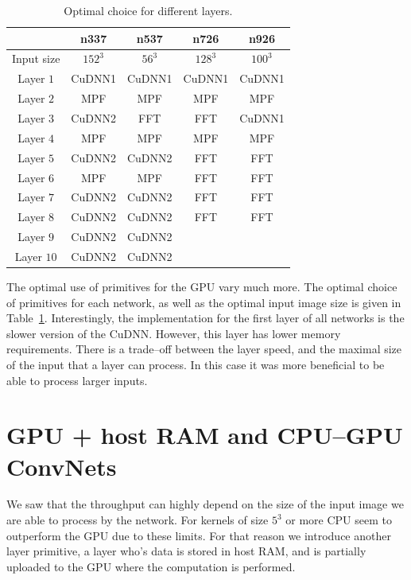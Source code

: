 \documentclass[conference]{./IEEEtran/IEEEtran}
\begin{document}
  \begin{table}
    \centering
    \begin{tabular}{ccccc}
      \toprule
      & n337    & n537  &  n726  &  n926 \\
      \midrule
      Input size & $152^3$ &  $56^3$  & $128^3$  & $100^3$ \\
      \midrule
      Layer $1$  &  CuDNN1  &  CuDNN1  & CuDNN1   & CuDNN1  \\
      Layer $2$  &  MPF     &  MPF     & MPF      & MPF     \\
      Layer $3$  &  CuDNN2  &  FFT     & FFT      & CuDNN1  \\
      Layer $4$  &  MPF     &  MPF     & MPF      & MPF     \\
      Layer $5$  &  CuDNN2  &  CuDNN2  & FFT      & FFT     \\
      Layer $6$  &  MPF     &  MPF     & FFT      & FFT     \\
      Layer $7$  &  CuDNN2  &  CuDNN2  & FFT      & FFT     \\
      Layer $8$  &  CuDNN2  &  CuDNN2  & FFT      & FFT     \\
      Layer $9$  &  CuDNN2  &  CuDNN2  & & \\
      Layer $10$ &  CuDNN2  &  CuDNN2  & & \\
      \bottomrule
    \end{tabular}
    \caption{Optimal choice for different layers.}
    \label{table:gpu_optimal}
  \end{table}



  The optimal use of primitives for the GPU vary much more.  The
  optimal choice of primitives for each network, as well as the
  optimal input image size is given in Table~\ref{table:gpu_optimal}.
  Interestingly, the implementation for the first layer of all
  networks is the slower version of the CuDNN.  However, this layer
  has lower memory requirements.  There is a trade--off between the
  layer speed, and the maximal size of the input that a layer can
  process.  In this case it was more beneficial to be able to process
  larger inputs.


\section{GPU + host RAM and CPU--GPU ConvNets}

  We saw that the throughput can highly depend on the size of the
  input image we are able to process by the network.  For kernels of
  size $5^3$ or more CPU seem to outperform the GPU due to these
  limits.  For that reason we introduce another layer primitive, a
  layer who's data is stored in host RAM, and is partially uploaded to
  the GPU where the computation is performed.
\end{document}
